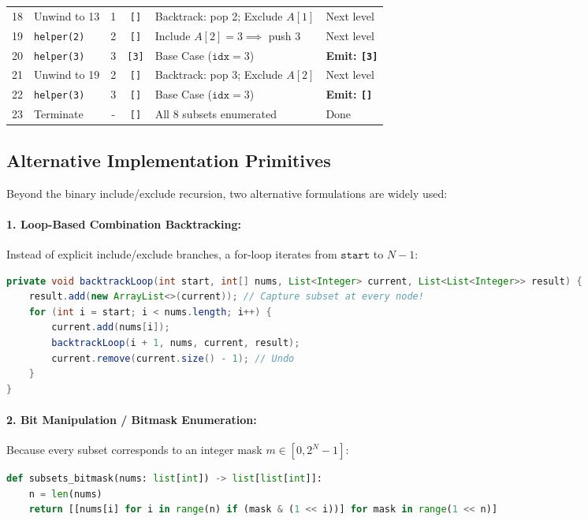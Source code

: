 \documentclass[10pt,journal,compsoc,onecolumn]{IEEEtran}
\begin{document}
\begin{table}[htbp]
\begin{tabular}{clccll}
18 & Unwind to 13 & 1 & \texttt{[]} & Backtrack: pop 2; Exclude $A[1]$ & Next level \\
19 & \texttt{helper(2)} & 2 & \texttt{[]} & Include $A[2]=3 \implies$ push 3 & Next level \\
20 & \texttt{helper(3)} & 3 & \texttt{[3]} & Base Case ($\texttt{idx}=3$) & \textbf{Emit: \texttt{[3]}} \\
21 & Unwind to 19 & 2 & \texttt{[]} & Backtrack: pop 3; Exclude $A[2]$ & Next level \\
22 & \texttt{helper(3)} & 3 & \texttt{[]} & Base Case ($\texttt{idx}=3$) & \textbf{Emit: \texttt{[]}} \\
23 & Terminate & - & \texttt{[]} & All 8 subsets enumerated & Done \\
\bottomrule
\end{tabular}
\end{table}

\subsection{Alternative Implementation Primitives}
Beyond the binary include/exclude recursion, two alternative formulations are widely used:
\paragraph{1. Loop-Based Combination Backtracking:}
Instead of explicit include/exclude branches, a for-loop iterates from $\texttt{start}$ to $N-1$:
\begin{lstlisting}[language=Java]
private void backtrackLoop(int start, int[] nums, List<Integer> current, List<List<Integer>> result) {
    result.add(new ArrayList<>(current)); // Capture subset at every node!
    for (int i = start; i < nums.length; i++) {
        current.add(nums[i]);
        backtrackLoop(i + 1, nums, current, result);
        current.remove(current.size() - 1); // Undo
    }
}
\end{lstlisting}

\paragraph{2. Bit Manipulation / Bitmask Enumeration:}
Because every subset corresponds to an integer mask $m \in [0, 2^N - 1]$:
\begin{lstlisting}[language=Python]
def subsets_bitmask(nums: list[int]) -> list[list[int]]:
    n = len(nums)
    return [[nums[i] for i in range(n) if (mask & (1 << i))] for mask in range(1 << n)]
\end{lstlisting}
\end{document}
